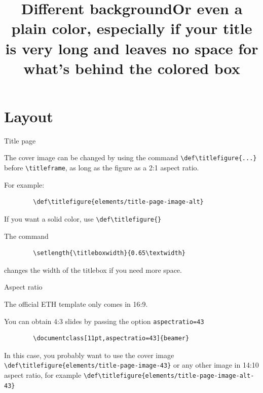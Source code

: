 \def\titlefigure{elements/title-page-image-alt}
\title{Different background}
\titleframe

\def\titlefigure{}
\setlength{\titleboxwidth}{0.75\textwidth}			%
\title{Or even a plain color, especially if your title is very long and leaves no space for what's behind the colored box}
\titleframe

\section{Layout}

\begin{frame}[fragile]{Title page}

	The cover image can be changed by using the command \verb+\def\titlefigure{...}+ before \verb+\titleframe+, as long as the figure as a 2:1 aspect ratio.
	
	For example:
	\begin{verbatim}
		\def\titlefigure{elements/title-page-image-alt}
	\end{verbatim}
	
	\medskip
	
	If you want a solid color, use \verb+\def\titlefigure{}+
	
	\medskip

	The command	
	\begin{verbatim}
		\setlength{\titleboxwidth}{0.65\textwidth}
	\end{verbatim}
	changes the width of the titlebox if you need more space.

\end{frame}

\begin{frame}[fragile]{Aspect ratio}

	The official ETH template only comes in 16:9.
	
	You can obtain 4:3 slides by passing the option \verb+aspectratio=43+
	\begin{verbatim}
		\documentclass[11pt,aspectratio=43]{beamer}	
	\end{verbatim}
		
	\bigskip
	
	In this case, you probably want to use the cover image \verb+\def\titlefigure{elements/title-page-image-43}+
	or any other image in 14:10 aspect ratio, for example \verb+\def\titlefigure{elements/title-page-image-alt-43}+
	
	
\end{frame}

